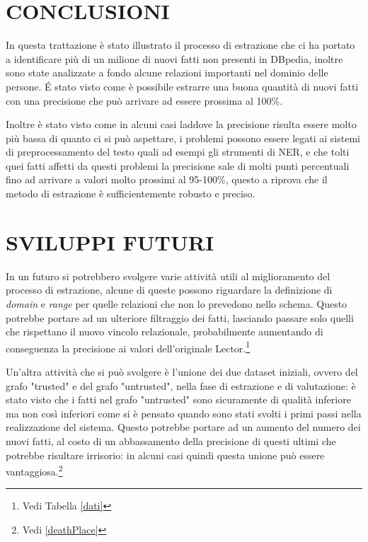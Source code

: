 \documentclass[10pt,a4paper,twocolumn]{article}
\begin{document}
\section{CONCLUSIONI}

In questa trattazione è stato illustrato il processo di estrazione che ci ha portato a identificare più di un milione di nuovi fatti non presenti in DBpedia, inoltre sono state analizzate a fondo alcune relazioni importanti nel dominio delle persone. \'E stato visto come è possibile estrarre una buona quantità di nuovi fatti con una precisione che può arrivare ad essere prossima al 100\%. 

Inoltre è stato visto come in alcuni casi laddove la precisione risulta essere molto più bassa di quanto ci si può aspettare, i problemi possono essere legati ai sistemi di preprocessamento del testo quali ad esempi gli strumenti di NER, e che tolti quei fatti affetti da questi problemi la precisione sale di molti punti percentuali fino ad arrivare a valori molto prossimi al 95-100\%, questo a riprova che il metodo di estrazione è sufficientemente robusto e preciso.

\section{SVILUPPI FUTURI}

In un futuro si potrebbero svolgere varie attività utili al miglioramento del processo di estrazione, alcune di queste possono riguardare la definizione di \textit{domain} e \textit{range} per quelle relazioni che non lo prevedono nello schema. Questo potrebbe portare ad un ulteriore filtraggio dei fatti, lasciando passare solo quelli che rispettano il nuovo vincolo relazionale, probabilmente aumentando di conseguenza la precisione ai valori dell'originale Lector.\footnote{Vedi Tabella \ref{dati}}

Un'altra attività che si può svolgere è l'unione dei due dataset iniziali, ovvero del grafo "trusted" e del grafo "untrusted", nella fase di estrazione e di valutazione: è stato visto che i fatti nel grafo "untrusted" sono sicuramente di qualità inferiore ma non così inferiori come si è pensato quando sono stati svolti i primi passi nella realizzazione del sistema. Questo potrebbe portare ad un aumento del numero dei nuovi fatti, al costo di un abbassamento della precisione di questi ultimi che potrebbe risultare irrisorio: in alcuni casi quindi questa unione può essere vantaggiosa.\footnote{Vedi \ref{deathPlace}}
\end{document}
